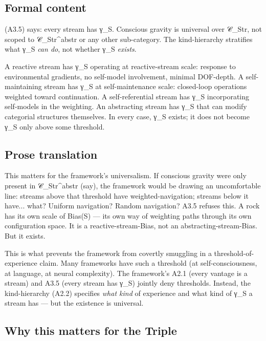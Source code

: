 \documentclass[11pt, openany]{book}
\begin{document}
\subsection{Formal content}

(A3.5) says: every stream has γ\_\allowbreak{}S. Conscious gravity is universal over 𝒞\_\allowbreak{}Str, not scoped to 𝒞\_\allowbreak{}Str\textasciicircum{}abstr or any other sub-category. The kind-hierarchy stratifies what γ\_\allowbreak{}S \textit{can do}, not whether γ\_\allowbreak{}S \textit{exists}.

A reactive stream has γ\_\allowbreak{}S operating at reactive-stream scale: response to environmental gradients, no self-model involvement, minimal DOF-depth. A self-maintaining stream has γ\_\allowbreak{}S at self-maintenance scale: closed-loop operations weighted toward continuation. A self-referential stream has γ\_\allowbreak{}S incorporating self-models in the weighting. An abstracting stream has γ\_\allowbreak{}S that can modify categorial structures themselves. In every case, γ\_\allowbreak{}S exists; it does not become γ\_\allowbreak{}S only above some threshold.

\subsection{Prose translation}

This matters for the framework's universalism. If conscious gravity were only present in 𝒞\_\allowbreak{}Str\textasciicircum{}abstr (say), the framework would be drawing an uncomfortable line: streams above that threshold have weighted-navigation; streams below it have... what? Uniform navigation? Random navigation? A3.5 refuses this. A rock has its own scale of Bias(S) --- its own way of weighting paths through its own configuration space. It is a reactive-stream-Bias, not an abstracting-stream-Bias. But it exists.

This is what prevents the framework from covertly smuggling in a threshold-of-experience claim. Many frameworks have such a threshold (at self-consciousness, at language, at neural complexity). The framework's A2.1 (every vantage is a stream) and A3.5 (every stream has γ\_\allowbreak{}S) jointly deny thresholds. Instead, the kind-hierarchy (A2.2) specifies \textit{what kind} of experience and what kind of γ\_\allowbreak{}S a stream has --- but the existence is universal.

\subsection{Why this matters for the Triple}
\end{document}
